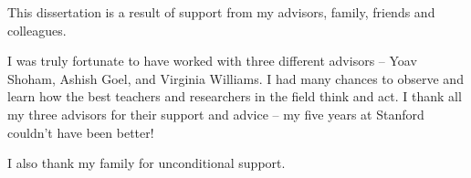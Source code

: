 This dissertation is a result of support from my advisors, family, friends and colleagues. 

I was truly fortunate to have worked with three different advisors -- Yoav Shoham, Ashish Goel, and Virginia Williams.
I had many chances to observe and learn how the best teachers and researchers in the field think and act.
I thank all my three advisors for their support and advice -- my five years at Stanford couldn't have been better!

I also thank my family for unconditional support.

